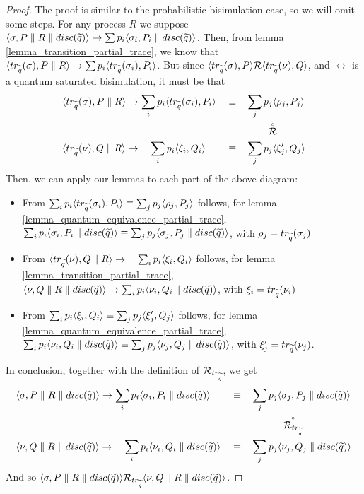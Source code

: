 \begin{proof}
The proof is similar to the probabilistic bisimulation case, so we will omit some steps.
For any process $R$ we suppose $\langle\sigma, P \parallel R \parallel disc(\widetilde{q})\rangle \rightarrow \sum p_i \langle\sigma_i, P_i \parallel disc(\widetilde{q})\rangle$. Then, from lemma \ref{lemma_transition_partial_trace}, we know that $\langle tr_{\widetilde{q}}(\sigma), P\parallel R\rangle \rightarrow \sum p_i \langle tr_{\widetilde{q}}(\sigma_i), P_i\rangle$. But since $\langle tr_{\widetilde{q}}(\sigma), P\rangle \mathcal{R} \langle tr_{\widetilde{q}}(\nu), Q\rangle$, and $\rel$ is a quantum saturated bisimulation, it must be that 
\begin{align*}
& \langle tr_{\widetilde{q}}(\sigma), P\parallel R\rangle \rightarrow \sum_i p_i \langle tr_{\widetilde{q}}(\sigma_i), P_i\rangle & & \equiv  &  & \sum_j p_j \langle\rho_j, P_j\rangle 
\\
 & & & & & \qquad\stackrel{\scriptscriptstyle \circ}{\mathcal{R}} 
\\
& \langle tr_{\widetilde{q}}(\nu), Q\parallel R\rangle \rightarrow \quad\sum_i p_i \langle\xi_i, Q_i\rangle & & \equiv & &  \sum_j p_j \langle\xi'_j, Q_j\rangle 
\end{align*} 
Then, we can apply our lemmas to each part of the above diagram: \begin{itemize}
\item From $\sum_i p_i \langle tr_{\widetilde{q}}(\sigma_i), P_i\rangle \equiv \sum_j p_j \langle\rho_j, P_j\rangle$ follows, for lemma \ref{lemma_quantum_equivalence_partial_trace}, $\sum_i p_i \langle\sigma_i, P_i\parallel disc(\widetilde{q})\rangle \equiv  \sum_j p_j \langle\sigma_j, P_j\parallel disc(\widetilde{q})\rangle$, with $\rho_j = tr_{\widetilde{q}}(\sigma_j)$
\item From $\langle tr_{\widetilde{q}}(\nu), Q\parallel R\rangle \rightarrow \quad\sum_i p_i \langle\xi_i, Q_i\rangle$ follows, for lemma \ref{lemma_transition_partial_trace}, $\langle\nu, Q\parallel R\parallel disc(\widetilde{q})\rangle \rightarrow \sum_i p_i \langle\nu_i, Q_i\parallel disc(\widetilde{q})\rangle$, with $\xi_i = tr_{\widetilde{q}}(\nu_i)$
\item From $\sum_i p_i \langle\xi_i, Q_i\rangle \equiv  \sum_j p_j \langle\xi'_j, Q_j\rangle$ follows, for lemma \ref{lemma_quantum_equivalence_partial_trace}, $\sum_i p_i \langle\nu_i, Q_i\parallel disc(\widetilde{q})\rangle \equiv  \sum_j p_j \langle\nu_j, Q_j\parallel disc(\widetilde{q})\rangle$, with $\xi'_j = tr_{\widetilde{q}}(\nu_j)$. 
\end{itemize}
In conclusion, together with the definition of $\mathcal{R}_{tr_{\widetilde{q}}}$, we get
\begin{align*}
& \langle\sigma, P\parallel R \parallel disc(\widetilde{q})\rangle \rightarrow \sum_i p_i \langle\sigma_i, P_i \parallel disc(\widetilde{q})\rangle & & \equiv  &  & \sum_j p_j \langle\sigma_j, P_j \parallel disc(\widetilde{q})\rangle 
\\
 & & & & & \qquad\quad\stackrel{\scriptscriptstyle \circ}{\mathcal{R}_{tr_{\widetilde{q}}}} 
\\
& \langle\nu, Q\parallel R\parallel disc(\widetilde{q})\rangle \rightarrow \quad\sum_i p_i \langle\nu_i, Q_i\parallel disc(\widetilde{q})\rangle & & \equiv & &  \sum_j p_j \langle\nu_j, Q_j\parallel disc(\widetilde{q})\rangle
\end{align*}
And so $\langle\sigma, P\parallel R \parallel disc(\widetilde{q})\rangle \mathcal{R}_{tr_{\widetilde{q}}}\langle\nu, Q\parallel R\parallel disc(\widetilde{q})\rangle$.
\end{proof}

